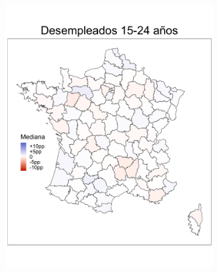 \begin{figure}
	\centering
	\begin{subfigure}{0.275\textwidth}
	\includegraphics[width = \textwidth]{Figs/Efectos/Mapa_Efectos_Des1_Modelo_H}
	\end{subfigure}
	~
	\begin{subfigure}{0.275\textwidth}

\end{subfigure}
\end{figure}
